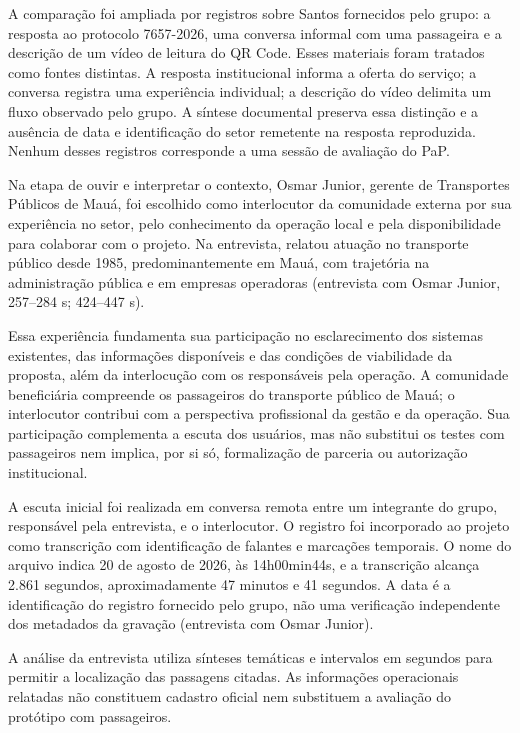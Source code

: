 \documentclass[12pt,oneside,a4paper,brazil,chapter=TITLE]{abntex2}
\begin{document}
A comparação foi ampliada por registros sobre Santos fornecidos pelo grupo: a resposta ao protocolo 7657-2026, uma conversa informal com uma passageira e a descrição de um vídeo de leitura do QR Code. Esses materiais foram tratados como fontes distintas. A resposta institucional informa a oferta do serviço; a conversa registra uma experiência individual; a descrição do vídeo delimita um fluxo observado pelo grupo. A síntese documental preserva essa distinção e a ausência de data e identificação do setor remetente na resposta reproduzida. Nenhum desses registros corresponde a uma sessão de avaliação do PaP.

\label{sec:escuta-comunidade}
Na etapa de ouvir e interpretar o contexto, Osmar Junior, gerente de Transportes Públicos de Mauá, foi escolhido como interlocutor da comunidade externa por sua experiência no setor, pelo conhecimento da operação local e pela disponibilidade para colaborar com o projeto. Na entrevista, relatou atuação no transporte público desde 1985, predominantemente em Mauá, com trajetória na administração pública e em empresas operadoras  (entrevista com Osmar Junior, 257--284 s; 424--447 s).

Essa experiência fundamenta sua participação no esclarecimento dos sistemas existentes, das informações disponíveis e das condições de viabilidade da proposta, além da interlocução com os responsáveis pela operação. A comunidade beneficiária compreende os passageiros do transporte público de Mauá; o interlocutor contribui com a perspectiva profissional da gestão e da operação. Sua participação complementa a escuta dos usuários, mas não substitui os testes com passageiros nem implica, por si só, formalização de parceria ou autorização institucional.

A escuta inicial foi realizada em conversa remota entre um integrante do grupo, responsável pela entrevista, e o interlocutor. O registro foi incorporado ao projeto como transcrição com identificação de falantes e marcações temporais. O nome do arquivo indica 20 de agosto de 2026, às 14h00min44s, e a transcrição alcança 2.861 segundos, aproximadamente 47 minutos e 41 segundos. A data é a identificação do registro fornecido pelo grupo, não uma verificação independente dos metadados da gravação  (entrevista com Osmar Junior).

A análise da entrevista utiliza sínteses temáticas e intervalos em segundos para permitir a localização das passagens citadas. As informações operacionais relatadas não constituem cadastro oficial nem substituem a avaliação do protótipo com passageiros.
\end{document}
